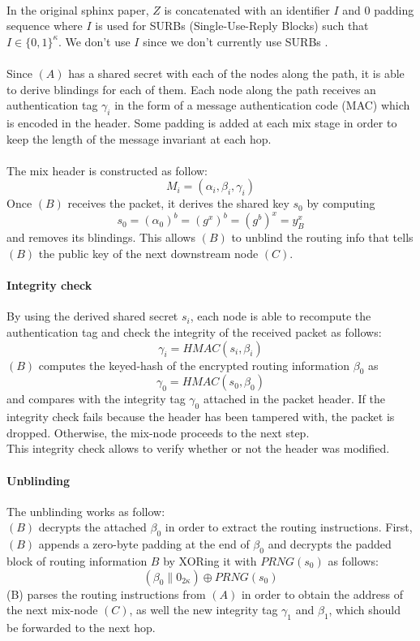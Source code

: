     \\In the original sphinx paper, $Z$ is concatenated with an identifier $I$ and $0$ padding sequence where $I$ is used for SURBs (Single-Use-Reply Blocks) such that $I \in \{0, 1\}^\kappa$. We don't use $I$ since we don't currently use SURBs .
    \\~\\Since $(A)$ has a shared secret with each of the nodes along the path, it is able to derive blindings for each of them.
    \newline Each node along the path receives an authentication tag $\gamma_i$ in the form of a message authentication code (MAC)
which is encoded in the header.
\newline Some padding is added at each mix stage in order to keep the length of the message invariant at each hop.
\\~\\The mix header is constructed as follow: $$M_i=(\alpha_i,\beta_i,\gamma_i)$$
\newline Once $(B)$ receives the packet, it derives the shared key $s_0$ by computing $$s_0=(\alpha_0)^b=(g^x)^b=(g^b)^x=y^x_B$$ and removes its blindings. This allows $(B)$ to unblind the routing info that tells $(B)$ the public key of the next downstream node $(C)$.
\paragraph{Integrity check}
By using the derived shared secret $s_i$, each node is able to recompute the authentication tag and check the integrity of the received packet as follows: $$\gamma_i=HMAC(s_i,\beta_i)$$
$(B)$ computes the keyed-hash of the encrypted routing information $\beta_0$ as $$\gamma_0=HMAC(s_0,\beta_0)$$ and compares with the integrity tag $\gamma_0$ attached in the packet header. If the integrity check fails because the header has been tampered with, the packet is dropped. Otherwise, the mix-node proceeds to the next step.
\\This integrity check allows to verify whether or not the header was modified.

\paragraph{Unblinding}
The unblinding works as follow:
\\$(B)$ decrypts the attached $\beta_0$ in order to extract the routing instructions. First, $(B)$ appends a zero-byte padding at the end of $\beta_0$ and decrypts the padded block of routing information $B$ by XORing it with $PRNG(s_{0})$ as follows:
$$(\beta_0\|0_{2\kappa})\oplus PRNG(s_{0})$$
(B) parses the routing instructions from $(A)$ in order to obtain the address of the next mix-node $(C)$, as well the new integrity tag $\gamma_1$ and $\beta_1$, which should be forwarded to the next hop.
